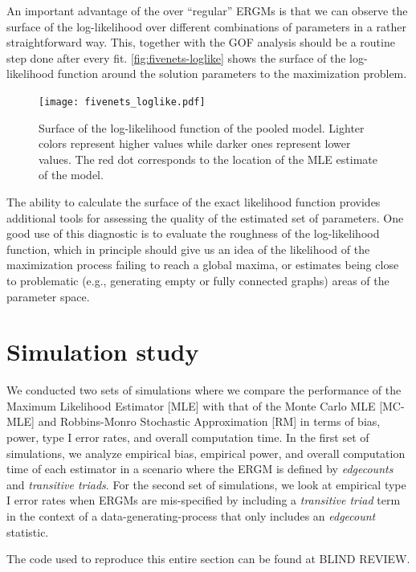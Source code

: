 \documentclass[review, nonatbib,doubleblind]{elsarticle/elsarticle}
\begin{document}
An important advantage of the \ergmitos{} over ``regular'' ERGMs is that we can observe the surface of the log-likelihood over different combinations of parameters in a rather straightforward way. This, together with the GOF analysis should be a routine step done after every \ergmito{} fit. \autoref{fig:fivenets-loglike} shows the surface of the log-likelihood function around the solution parameters to the maximization problem.

\begin{figure}[tb]
    \centering
    \caption{Surface of the log-likelihood function of the pooled \ergmito{} model. Lighter colors represent higher values while darker ones represent lower values. The red dot corresponds to the location of the MLE estimate of the model.}
    \texttt{[image: fivenets\_loglike.pdf]}
    \label{fig:fivenets-loglike}
\end{figure}

The ability to calculate the surface of the exact likelihood function provides additional tools for assessing the quality of the estimated set of parameters. One good use of this diagnostic is to evaluate the roughness of the log-likelihood function, which in principle should give us an idea of the likelihood of the maximization process failing to reach a global maxima, or estimates being close to problematic (e.g., generating empty or fully connected graphs) areas of the parameter space.

\section{Simulation study\label{sec:simulation-study}}

We conducted two sets of simulations where we compare the performance of the Maximum Likelihood Estimator [MLE] with that of the Monte Carlo MLE [MC-MLE] and Robbins-Monro Stochastic Approximation [RM] in terms of bias, power, type I error rates, and overall computation time. In the first set of simulations, we analyze empirical bias, empirical power, and overall computation time of each estimator in a scenario where the ERGM is defined by \textit{edgecounts} and \textit{transitive triads}. For the second set of simulations, we look at empirical type I error rates when ERGMs are mis-specified by including a \textit{transitive triad} term in the context of a data-generating-process that only includes an \textit{edgecount} statistic.

The code used to reproduce this entire section can be found at BLIND REVIEW. %
\end{document}
